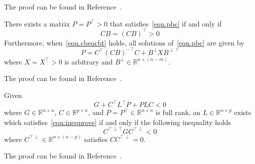 \begin{proof-dan}
  The proof can be found in Reference\ \cite{narendra.frequency.1973}.
\end{proof-dan}

\begin{cor-dan}
  There exists a matrix $P=P^{\top}>0$ that satisfies\ \eqref{eqn.pbc} if and only if 
  \begin{equation}
    \label{eqn.cbeqcbt}
    CB=(CB)^{\top}>0
  \end{equation}
  Furthermore, when\ \eqref{eqn.cbeqcbt} holds, all solutions of\ \eqref{eqn.pbc} are given by
  \begin{equation}
    \label{eqn.Psolutions}
    P=C^{\top}(CB)^{-\top}C+B^{\perp}XB^{\perp\top}
  \end{equation}
  where $X=X^{\top}>0$ is arbitrary and $B^{\perp}\in\mathbb{R}^{n\times(n-m)}$.
\end{cor-dan}

\begin{proof-dan}
  The proof can be found in Reference\ \cite{huang.designspr.1999}.
\end{proof-dan}

\begin{lem-dan}\label{lem.elimination}
  Given 
  \begin{equation}
    \label{eqn:ineqprove}
    G+C^{\top}L^{\top}P+PLC<0
  \end{equation}
  where $G\in\mathbb{R}^{n\times n}$, $C\in\mathbb{R}^{p\times n}$, and $P=P^{\top}\in\mathbb{R}^{n\times n}$ is full rank, an $L\in\mathbb{R}^{n\times p}$ exists which satisfies\ \eqref{eqn:ineqprove} if and only if the following inequality holds
  \begin{equation*}
    C^{\top\perp\top}GC^{\top\perp}<0
  \end{equation*}
  where $C^{\top\perp}\in\mathbb{R}^{n\times(n-p)}$ satisfies $CC^{\top\perp}=0$.
\end{lem-dan}

\begin{proof-dan}
  The proof can be found in Reference\ \cite{boyd.lmibook.1994}.
\end{proof-dan}
